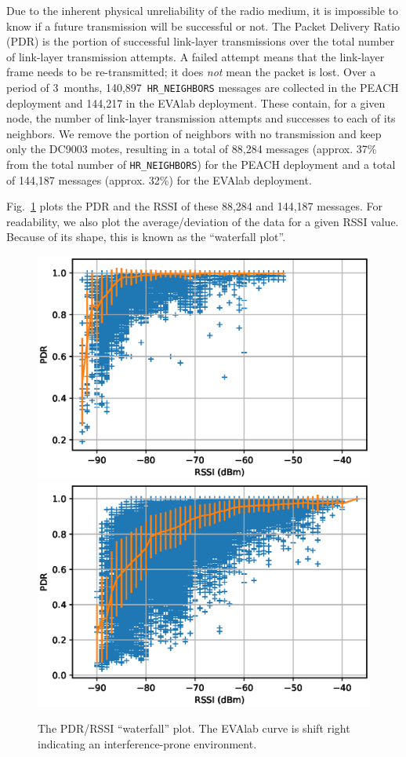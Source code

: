 \documentclass{elsarticle}
\newcommand{\HRNEIGHBORS}         {{\tt HR\_NEIGHBORS}\xspace}
\newcommand{\PEACHNUMHRNEIGHBORS} {140,897\xspace}
\newcommand{\EVANUMHRNEIGHBORS}   {144,217\xspace}
\begin{document}
Due to the inherent physical unreliability of the radio medium, it is impossible to know if a future transmission will be successful or not.
The Packet Delivery Ratio (PDR) is the portion of successful link-layer transmissions over the total number of link-layer transmission attempts.
A failed attempt means that the link-layer frame needs to be re-transmitted; it does \textit{not} mean the packet is lost.
Over a period of 3~months, \PEACHNUMHRNEIGHBORS~\HRNEIGHBORS messages are collected in the PEACH deployment and \EVANUMHRNEIGHBORS in the EVAlab deployment.
These contain, for a given node, the number of link-layer transmission attempts and successes to each of its neighbors.
We remove the portion of neighbors with no transmission and keep only the DC9003 motes, resulting in a total of 88,284 messages (approx. 37\% from the total number of \HRNEIGHBORS) for the PEACH deployment and a total of 144,187 messages (approx. 32\%) for the EVAlab deployment.


Fig.~\ref{fig:waterfall} plots the PDR and the RSSI of these 88,284 and 144,187 messages.
For readability, we also plot the average/deviation of the data for a given RSSI value.
Because of its shape, this is known as the ``waterfall plot''.

\begin{figure}
    \includegraphics[width=0.5\columnwidth]{waterfall_peach.eps}
    \includegraphics[width=0.5\columnwidth]{waterfall.eps}  
    \caption{
        The PDR/RSSI ``waterfall'' plot. The EVAlab curve is shift right indicating an interference-prone environment.
    }
    \label{fig:waterfall}
\end{figure}
\end{document}
